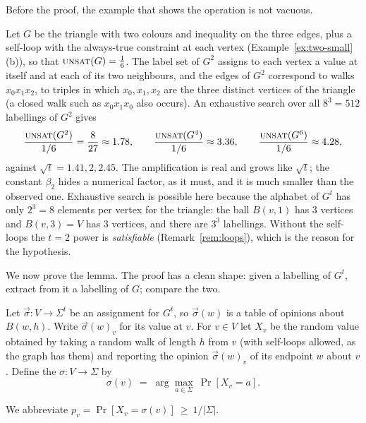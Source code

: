 Before the proof, the example that shows the operation is not vacuous.

\begin{example}\label{ex:tri-power}
Let $G$ be the triangle with two colours and inequality on the three edges, plus a self-loop with the always-true constraint at each vertex (Example~\ref{ex:two-small}(b)), so that $\textsc{unsat}(G)=\frac16$.
The label set of $G^2$ assigns to each vertex a value at itself and at each of its two neighbours, and the edges of $G^2$ correspond to walks $x_0x_1x_2$, \ie to triples in which $x_0,x_1,x_2$ are the three distinct vertices of the triangle (a closed walk such as $x_0x_1x_0$ also occurs).
An exhaustive search over all $8^3=512$ labellings of $G^2$ gives
\[
  \frac{\textsc{unsat}(G^2)}{1/6}=\frac{8}{27}\approx1.78,\qquad
  \frac{\textsc{unsat}(G^4)}{1/6}\approx3.36,\qquad
  \frac{\textsc{unsat}(G^6)}{1/6}\approx4.28,
\]
against $\sqrt t=1.41,2,2.45$.  The amplification is real and grows like $\sqrt t$; the constant $\beta_2$ hides a numerical factor, as it must, and it is much smaller than the observed one.
Exhaustive search is possible here because the alphabet of $G^t$ has only $2^3=8$ elements per vertex for the triangle: the ball $B(v,1)$ has $3$ vertices and $B(v,3)=V$ has $3$ vertices, and there are $3^3$ labellings.
Without the self-loops the $t=2$ power is \emph{satisfiable} (Remark~\ref{rem:loops}), which is the reason for the hypothesis.
\end{example}

\noindent
We now prove the lemma.  The proof has a clean shape: given a labelling of $G^t$, extract from it a labelling of $G$; compare the two.

\begin{definition}\label{def:popular}
Let $\vec\sigma\colon V\to\Sigma^t$ be an assignment for $G^t$, so $\vec\sigma(w)$ is a table of opinions about $B(w,h)$.  Write $\vec\sigma(w)_v$ for its value at $v$.
For $v\in V$ let $X_v$ be the random value obtained by taking a random walk of length $h$ from $v$ (with self-loops allowed, as the graph has them) and reporting the opinion $\vec\sigma(w)_v$ of its endpoint $w$ about $v$.
Define the  $\sigma\colon V\to\Sigma$ by
\[
  \sigma(v)\;=\;\arg\max_{a\in\Sigma}\ \Pr[X_v=a].
\]
\end{definition}

\noindent
We abbreviate $p_v=\Pr[X_v=\sigma(v)]\ \ge\ 1/|\Sigma|$.

